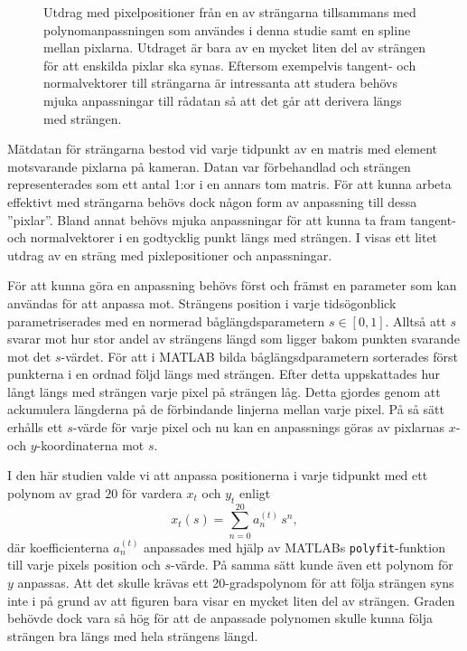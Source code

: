 \begin{figure}\centering

\caption{
Utdrag med pixelpositioner från en av strängarna tillsammans med polynomanpassningen som användes i denna studie samt en spline mellan pixlarna. Utdraget är bara av en mycket liten del av strängen för att enskilda pixlar ska synas.
Eftersom exempelvis tangent- och normalvektorer till strängarna är intressanta att studera behövs mjuka anpassningar till rådatan så att det går att derivera längs med strängen. 
}
\label{fig:strang_anpassning}
\end{figure}

Mätdatan för strängarna bestod vid varje tidpunkt av en matris med element motsvarande pixlarna på kameran. Datan var förbehandlad och strängen representerades som ett antal 1:or i en annars tom matris. 
För att kunna arbeta effektivt med strängarna behövs dock någon form av anpassning till dessa ''pixlar''. Bland annat behövs mjuka anpassningar för att kunna ta fram tangent- och normalvektorer i en godtycklig punkt längs med strängen. I  visas ett litet utdrag av en sträng med pixlepositioner och anpassningar. 

För att kunna göra en anpassning behövs först och främst en parameter som kan användas för att anpassa mot. 
Strängens position i varje tidsögonblick parametriserades med en normerad båglängdsparametern $s\in[0,1]$. Alltså att $s$ svarar mot hur stor andel av strängens längd som ligger bakom punkten svarande mot det $s$-värdet. 
För att i MATLAB bilda båglängsdparametern sorterades först punkterna i en ordnad följd längs med strängen. Efter detta uppskattades hur långt längs med strängen varje pixel på strängen låg. Detta gjordes genom att ackumulera längderna på de förbindande linjerna mellan varje pixel. På så sätt erhålls ett $s$-värde för varje pixel och nu kan en anpassnings göras av pixlarnas $x$- och $y$-koordinaterna mot $s$.

I den här studien valde vi att anpassa positionerna i varje tidpunkt med ett polynom av grad $20$ för vardera $x_t$ och $y_t$ enligt
\begin{equation}\label{eq:anpassning}
x_t(s) = \sum_{n=0}^{20} a_n^{(t)} \,s^n,
\end{equation}
där koefficienterna $a_n^{(t)}$ anpassades med hjälp av MATLABs \texttt{polyfit}-funktion till varje pixels position och $s$-värde. På samma sätt kunde även ett polynom för $y$ anpassas. Att det skulle krävas ett 20-gradspolynom för att följa strängen syns inte i  på grund av att figuren bara visar en mycket liten del av strängen. Graden behövde dock vara så hög för att de anpassade polynomen skulle kunna följa strängen bra längs med hela strängens längd. 

